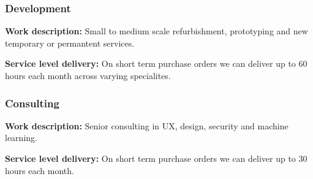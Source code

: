 \subsubsection{Development}
\textbf{Work description:} Small to medium scale refurbishment, prototyping and new temporary or permantent services.

\textbf{Service level delivery:} On short term purchase orders we can deliver up to 60 hours each month across varying specialites.

\subsubsection{Consulting}
\textbf{Work description:} Senior consulting in UX, design, security and machine learning.

\textbf{Service level delivery:} On short term purchase orders we can deliver up to 30 hours each month.


